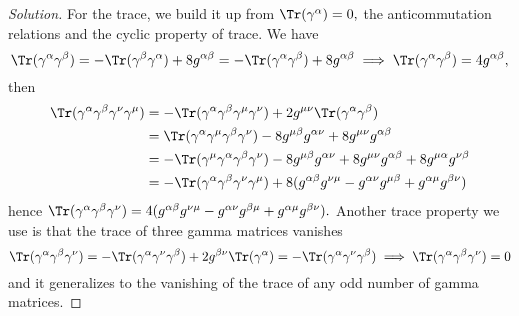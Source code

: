 \begin{proof}[Solution]
   For the trace, we build it up from \(\Tr(\gamma^\alpha) = 0,\) the anticommutation relations and the cyclic property of trace. We have
   \begin{equation*}
      \Tr(\gamma^\alpha \gamma^\beta) = -\Tr(\gamma^\beta \gamma^\alpha) + 8g^{\alpha \beta} = -\Tr(\gamma^\alpha \gamma^\beta) + 8g^{\alpha \beta} \implies \Tr(\gamma^\alpha \gamma^\beta) = 4g^{\alpha \beta},
   \end{equation*}
   then
   \begin{align*}
      \Tr(\gamma^\alpha \gamma^\beta \gamma^\nu \gamma^\mu) &= -\Tr(\gamma^\alpha \gamma^\beta \gamma^\mu \gamma^\nu) + 2g^{\mu\nu}\Tr(\gamma^\alpha \gamma^\beta)\\
                                                            &= \Tr(\gamma^\alpha \gamma^\mu\gamma^\beta \gamma^\nu) - 8g^{\mu \beta} g^{\alpha \nu} + 8 g^{\mu\nu} g^{\alpha \beta}\\
                                                            &= -\Tr(\gamma^\mu \gamma^\alpha \gamma^\beta \gamma^\nu) - 8 g^{\mu\beta}g^{\alpha \nu} + 8 g^{\mu \nu}g^{\alpha \beta} + 8 g^{\mu \alpha} g^{\nu \beta}\\
                                                            &= -\Tr(\gamma^\alpha \gamma^\beta \gamma^\nu \gamma^\mu) + 8(g^{\alpha \beta}g^{\nu\mu} - g^{\alpha \nu}g^{\mu \beta} + g^{\alpha\mu}g^{\beta\nu})
   \end{align*}
   hence \(\Tr(\gamma^\alpha \gamma^\beta \gamma^\nu) = 4(g^{\alpha \beta} g^{\nu\mu}-g^{\alpha\nu}g^{\beta\mu} + g^{\alpha \mu}g^{\beta \nu}).\) Another trace property we use is that the trace of three gamma matrices vanishes
   \begin{equation*}
      \Tr(\gamma^\alpha \gamma^\beta \gamma^\nu) = - \Tr(\gamma^\alpha \gamma^\nu \gamma^\beta) + 2g^{\beta \nu} \Tr(\gamma^\alpha) = - \Tr(\gamma^\alpha \gamma^\nu \gamma^\beta) \implies \Tr(\gamma^\alpha \gamma^\beta \gamma^\nu) = 0
   \end{equation*}
   and it generalizes to the vanishing of the trace of any odd number of gamma matrices.
\end{proof}
